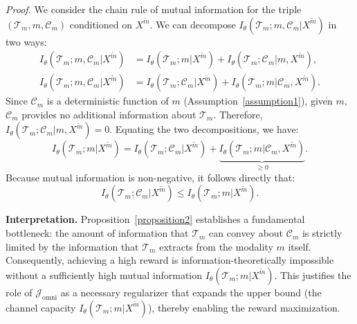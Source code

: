 \documentclass{article}
\theoremstyle{plain}
\theoremstyle{definition}
\theoremstyle{remark}
\begin{document}
\noindent \textit{Proof.}
We consider the chain rule of mutual information for the triple $(\mathcal{T}_{m}, m, \mathcal{C}_{m})$ conditioned on $X^{\tilde{m}}$. We can decompose $I_\theta(\mathcal{T}_{m}; m, \mathcal{C}_{m} | X^{\tilde{m}})$ in two ways:
\begin{align}
    \label{eq:chain_rule_1}
    I_\theta(\mathcal{T}_{m}; m, \mathcal{C}_{m} | X^{\tilde{m}}) &= I_\theta(\mathcal{T}_{m}; m | X^{\tilde{m}}) + I_\theta(\mathcal{T}_{m}; \mathcal{C}_{m} | m, X^{\tilde{m}}), \\
    \label{eq:chain_rule_2}
    I_\theta(\mathcal{T}_{m}; m, \mathcal{C}_{m} | X^{\tilde{m}}) &= I_\theta(\mathcal{T}_{m}; \mathcal{C}_{m} | X^{\tilde{m}}) + I_\theta(\mathcal{T}_{m}; m | \mathcal{C}_{m}, X^{\tilde{m}}).
\end{align}
Since $\mathcal{C}_{m}$ is a deterministic function of $m$ (Assumption~\ref{assumption1}), given $m$, $\mathcal{C}_{m}$ provides no additional information about $\mathcal{T}_{m}$. Therefore, $I_\theta(\mathcal{T}_{m}; \mathcal{C}_{m} | m, X^{\tilde{m}}) = 0$. Equating the two decompositions, we have:
\begin{equation}
    \label{eq:equating}
    I_\theta(\mathcal{T}_{m}; m | X^{\tilde{m}}) = I_\theta(\mathcal{T}_{m}; \mathcal{C}_{m} | X^{\tilde{m}}) + \underbrace{I_\theta(\mathcal{T}_{m}; m | \mathcal{C}_{m}, X^{\tilde{m}})}_{\geq 0}.
\end{equation}
Because mutual information is non-negative, it follows directly that:
\begin{equation}
    \label{eq:final_result}
    I_\theta(\mathcal{T}_{m}; \mathcal{C}_{m} | X^{\tilde{m}}) \leq I_\theta(\mathcal{T}_{m}; m | X^{\tilde{m}}).
\end{equation}



\noindent\textbf{Interpretation.}
Proposition~\ref{proposition2} establishes a fundamental bottleneck: the amount of information that $\mathcal{T}_{m}$ can convey about $\mathcal{C}_{m}$ is strictly limited by the information that $\mathcal{T}_{m}$ extracts from the modality $m$ itself. Consequently, achieving a high reward is information-theoretically impossible without a sufficiently high mutual information $I_\theta(\mathcal{T}_{m}; m | X^{\tilde{m}})$. This justifies the role of $\mathcal{J}_{\mathrm{omni}}$ as a necessary regularizer that expands the upper bound (the channel capacity $I_\theta(\mathcal{T}_{m}; m | X^{\tilde{m}})$), thereby enabling the reward maximization.
\end{document}
